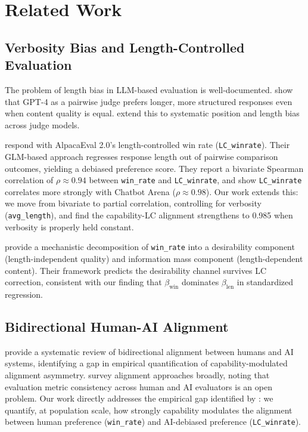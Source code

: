 \section{Related Work}
\label{sec:related}

\subsection{Verbosity Bias and Length-Controlled Evaluation}

The problem of length bias in LLM-based evaluation is well-documented.
\citet{Zheng2023Judging} show that GPT-4 as a pairwise judge prefers longer, more structured
responses even when content quality is equal. \citet{Shi2024Judging} extend this to systematic
position and length bias across judge models.

\citet{Dubois2024LengthControlled} respond with AlpacaEval 2.0's length-controlled win rate
(\texttt{LC\_winrate}). Their GLM-based approach regresses response length out of pairwise
comparison outcomes, yielding a debiased preference score. They report a bivariate Spearman
correlation of $\rho \approx 0.94$ between \texttt{win\_rate} and \texttt{LC\_winrate}, and
show \texttt{LC\_winrate} correlates more strongly with Chatbot Arena ($\rho \approx 0.98$).
Our work extends this: we move from bivariate to partial correlation, controlling for verbosity
(\texttt{avg\_length}), and find the capability-LC alignment strengthens to 0.985 when
verbosity is properly held constant.

\citet{Hu2024Explaining} provide a mechanistic decomposition of \texttt{win\_rate} into a
desirability component (length-independent quality) and information mass component
(length-dependent content). Their framework predicts the desirability channel survives LC
correction, consistent with our finding that $\beta_{\mathrm{win}}$ dominates
$\beta_{\mathrm{len}}$ in standardized regression.

\subsection{Bidirectional Human-AI Alignment}

\citet{Shen2024Bidirectional} provide a systematic review of bidirectional alignment between
humans and AI systems, identifying a gap in empirical quantification of capability-modulated
alignment asymmetry. \citet{Ji2023Survey} survey alignment approaches broadly, noting that
evaluation metric consistency across human and AI evaluators is an open problem. Our work
directly addresses the empirical gap identified by \citet{Shen2024Bidirectional}: we quantify,
at population scale, how strongly capability modulates the alignment between human preference
(\texttt{win\_rate}) and AI-debiased preference (\texttt{LC\_winrate}).

